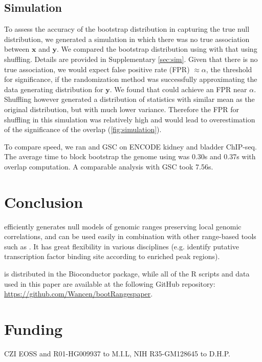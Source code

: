 \subsection{Simulation}

To assess the accuracy of the bootstrap distribution in capturing
the true null distribution, we generated a simulation in which
there was no true association between $\bm{x}$ and $\bm{y}$. 
We compared the bootstrap distribution using \bootranges 
with that using shuffling. Details are provided in Supplementary
\cref{sec:sim}. 
Given that there is no true association, we would expect false
positive rate (FPR) $\approx \alpha$, 
the threshold for significance, if the randomization method was 
successfully approximating the data generating distribution for $\bm{y}$.
We found that \bootranges could achieve an FPR near $\alpha$. 
Shuffling however generated a distribution of statistics
with similar mean as the original distribution, but with much lower
variance.
Therefore the FPR for shuffling in this simulation was relatively high 
and would lead to overestimation of the significance of the overlap 
(\cref{fig:simulation}).

To compare speed, we ran \bootranges and GSC on
ENCODE kidney and bladder ChIP-seq. The average time to
block bootstrap the genome using \bootranges was 0.30s and
0.37s with overlap computation. A comparable analysis with GSC took
7.56s.

\section{Conclusion}

\bootranges efficiently generates null models of genomic ranges preserving 
local genomic correlations, and can be used easily in combination with
other range-based tools such as \plyranges.
It has great flexibility in various disciplines (e.g. identify
putative transcription factor binding site according to enriched peak
regions).

\bootranges is distributed in the \nullranges Bioconductor package,
while all of the R scripts and data used in this paper are available
at the following GitHub repository: 
\url{https://github.com/Wancen/bootRangespaper}.

\section*{Funding}
CZI EOSS and R01-HG009937 to M.I.L, NIH R35-GM128645 to D.H.P.

